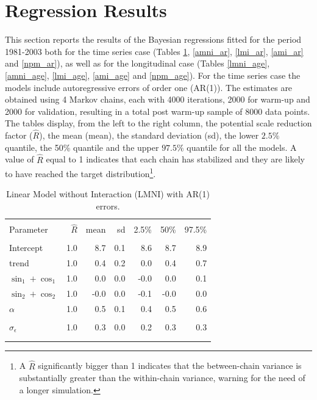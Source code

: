 \documentclass{article}\usepackage[]{graphicx}\usepackage[]{color}
\begin{document}
\bigskip 



\newpage

\section{Regression Results}\label{Results}

This section reports the results of the Bayesian regressions fitted for the period 1981-2003 both for the time series case (Tables \ref{lmni_ar}, \ref{amni_ar}, \ref{lmi_ar}, \ref{ami_ar} and \ref{npm_ar}), as well as for the longitudinal case (Tables \ref{lmni_age}, \ref{amni_age}, \ref{lmi_age}, \ref{ami_age} and \ref{npm_age}). For the time series case the models include autoregressive errors of order one (AR(1)). The estimates are obtained using 4 Markov chains, each with 4000 iterations, 2000 for warm-up and 2000 for validation, resulting in a total post warm-up sample of 8000 data points. The tables display, from the left to the right column, the potential scale reduction factor ($\hat{R}$), the mean (mean), the standard deviation (sd), the lower $2.5\%$ quantile, the 50\% quantile and the upper $97.5\%$ quantile for all the models. A value of $\hat{R}$ equal to 1 indicates that each chain has stabilized and they are likely to have reached the target distribution\footnote{A $\hat{R}$ significantly bigger than 1 indicates that the between-chain variance is substantially greater than the within-chain variance, warning for the need of a longer simulation.}. 
 
\begin{table}[bp!]
\caption{Linear Model without Interaction (LMNI) with AR(1) errors.}
\label{lmni_ar}
\centering
\begin{tabular}{lrrrrrr}
\\[-1.8ex]\hline 
\hline \\[-1.8ex]
Parameter & $\hat{R}$  & mean & sd & 2.5\% & 50\% & 97.5\% \\ 
\hline \\[-1.8ex] 
Intercept & 1.0 & 8.7 & 0.1 & 8.6 & 8.7 & 8.9 \\ 
trend & 1.0 & 0.4 & 0.2 & 0.0 & 0.4 & 0.7 \\ 
$\sin_{1} + \cos_{1}$ & 1.0 & 0.0 & 0.0 & -0.0 & 0.0 & 0.1 \\ 
$\sin_{2} + \cos_{2}$ & 1.0 & -0.0 & 0.0 & -0.1 & -0.0 & 0.0 \\ 
$\alpha$ & 1.0 & 0.5 & 0.1 & 0.4 & 0.5 & 0.6 \\ 
  \hline \\[-1.8ex] 
$\sigma_{\epsilon}$  & 1.0 & 0.3 & 0.0 & 0.2 & 0.3 & 0.3 \\ 
\\[-1.8ex]\hline 
\hline \\[-1.8ex] 
\end{tabular}
\end{table}
\end{document}
